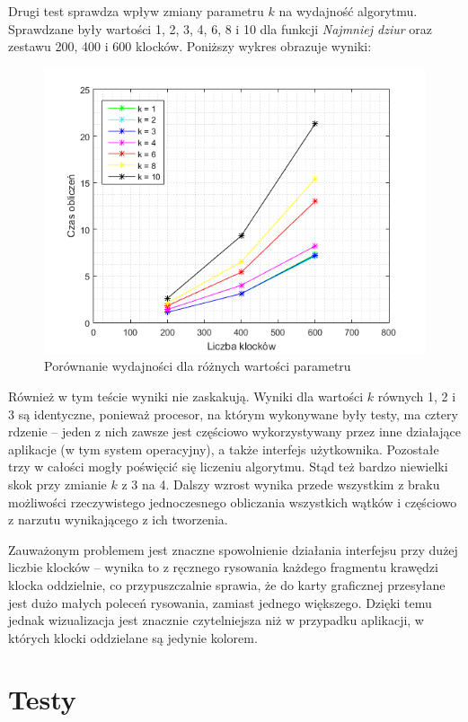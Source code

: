 \documentclass{article}
\begin{document}
Drugi test sprawdza wpływ zmiany parametru $k$ na wydajność algorytmu. Sprawdzane były wartości 1, 2, 3, 4, 6, 8 i 10 dla funkcji \textit{Najmniej dziur} oraz zestawu 200, 400 i 600 klocków. Poniższy wykres obrazuje wyniki:
\begin{figure}[H]
\includegraphics[width=\textwidth]{porownanie_k.png}
\caption{Porównanie wydajności dla różnych wartości parametru}
\end{figure}
Również w tym teście wyniki nie zaskakują. Wyniki dla wartości $k$ równych 1, 2 i 3 są identyczne, ponieważ procesor, na którym wykonywane były testy, ma cztery rdzenie -- jeden z nich zawsze jest częściowo wykorzystywany przez inne działające aplikacje (w tym system operacyjny), a także interfejs użytkownika. Pozostałe trzy w całości mogły poświęcić się liczeniu algorytmu. Stąd też bardzo niewielki skok przy zmianie $k$ z 3 na 4. Dalszy wzrost wynika przede wszystkim z braku możliwości rzeczywistego jednoczesnego obliczania wszystkich wątków i częściowo z narzutu wynikającego z ich tworzenia.

Zauważonym problemem jest znaczne spowolnienie działania interfejsu przy dużej liczbie klocków -- wynika to z ręcznego rysowania każdego fragmentu krawędzi klocka oddzielnie, co przypuszczalnie sprawia, że do karty graficznej przesyłane jest dużo małych poleceń rysowania, zamiast jednego większego. Dzięki temu jednak wizualizacja jest znacznie czytelniejsza niż w przypadku aplikacji, w których klocki oddzielane są jedynie kolorem. 
\clearpage



\section{Testy}
\end{document}
